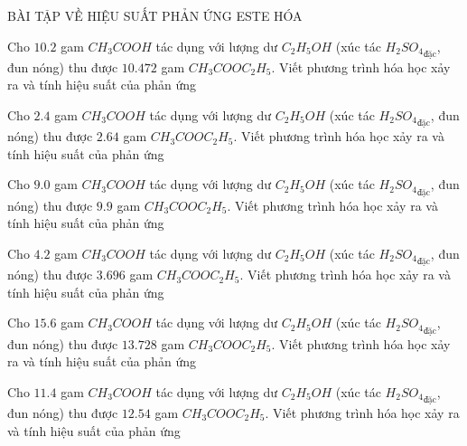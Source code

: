 \begin{tcolorbox}[
colback=\mycolor!10,
frame empty,
fontupper =\LARGE\bfseries\color{\maudam},
halign =center
]
BÀI TẬP VỀ HIỆU SUẤT PHẢN ỨNG ESTE HÓA
\end{tcolorbox}

\begin{bt}
Cho $10.2$ gam $CH_3COOH$ tác dụng với lượng dư $C_2H_5OH$ (xúc tác ${H_2SO_4}_{\text{đặc}}$, đun nóng) thu được $10.472$ gam $CH_3COOC_2H_5$. Viết phương trình hóa học xảy ra và tính hiệu suất của phản ứng
\end{bt}

\begin{bt}
Cho $2.4$ gam $CH_3COOH$ tác dụng với lượng dư $C_2H_5OH$ (xúc tác ${H_2SO_4}_{\text{đặc}}$, đun nóng) thu được $2.64$ gam $CH_3COOC_2H_5$. Viết phương trình hóa học xảy ra và tính hiệu suất của phản ứng
\end{bt}

\begin{bt}
Cho $9.0$ gam $CH_3COOH$ tác dụng với lượng dư $C_2H_5OH$ (xúc tác ${H_2SO_4}_{\text{đặc}}$, đun nóng) thu được $9.9$ gam $CH_3COOC_2H_5$. Viết phương trình hóa học xảy ra và tính hiệu suất của phản ứng
\end{bt}

\begin{bt}
Cho $4.2$ gam $CH_3COOH$ tác dụng với lượng dư $C_2H_5OH$ (xúc tác ${H_2SO_4}_{\text{đặc}}$, đun nóng) thu được $3.696$ gam $CH_3COOC_2H_5$. Viết phương trình hóa học xảy ra và tính hiệu suất của phản ứng
\end{bt}

\begin{bt}
Cho $15.6$ gam $CH_3COOH$ tác dụng với lượng dư $C_2H_5OH$ (xúc tác ${H_2SO_4}_{\text{đặc}}$, đun nóng) thu được $13.728$ gam $CH_3COOC_2H_5$. Viết phương trình hóa học xảy ra và tính hiệu suất của phản ứng
\end{bt}

\begin{bt}
Cho $11.4$ gam $CH_3COOH$ tác dụng với lượng dư $C_2H_5OH$ (xúc tác ${H_2SO_4}_{\text{đặc}}$, đun nóng) thu được $12.54$ gam $CH_3COOC_2H_5$. Viết phương trình hóa học xảy ra và tính hiệu suất của phản ứng
\end{bt}

